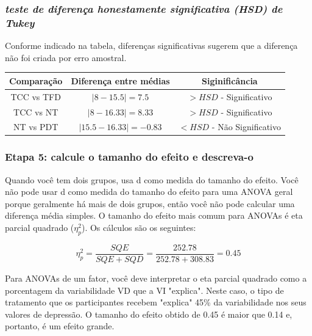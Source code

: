 \documentclass[11pt]{beamer}
\begin{document}
\begin{frame}
\frametitle{\textit{teste de diferença honestamente significativa (HSD) de Tukey}}

Conforme indicado na tabela, diferenças significativas sugerem que a diferença não foi criada por erro amostral.

\begin{table}[h]
\centering
\begin{tabular}{ccc}
\hline
Comparação & Diferença entre médias & Siginificância\\
\hline
TCC vs TFD & $|8-15.5|=7.5$ & $>HSD$ - Significativo\\
TCC vs NT & $|8-16.33|=8.33$ & $>HSD$ - Significativo\\
NT vs PDT & $|15.5-16.33|=-0.83$ & $<HSD$ - Não Significativo\\
\hline
\end{tabular}
\end{table}

\end{frame}


\begin{frame}
\frametitle{Etapa 5: calcule o tamanho do efeito e descreva-o}
Quando você tem dois grupos, usa d como medida do tamanho do efeito. Você não pode usar d como medida do tamanho do efeito para uma ANOVA geral porque geralmente há mais de dois grupos, então você não pode calcular uma diferença média simples. O tamanho do efeito mais comum para ANOVAs é eta parcial quadrado  ($\eta_p^2$). Os cálculos são os seguintes:

\[\eta_p^2 = \frac{SQE}{SQE+SQD}=\frac{252.78}{252.78+308.83}=0.45\]

Para ANOVAs de um fator, você deve interpretar o eta parcial quadrado como a porcentagem da variabilidade VD que a VI "explica". Neste caso, o tipo de tratamento que os participantes recebem "explica" 45\% da variabilidade nos seus valores de depressão. O tamanho do efeito obtido de 0.45 é maior que 0.14 e, portanto, é um efeito grande.

\end{frame}
\end{document}
